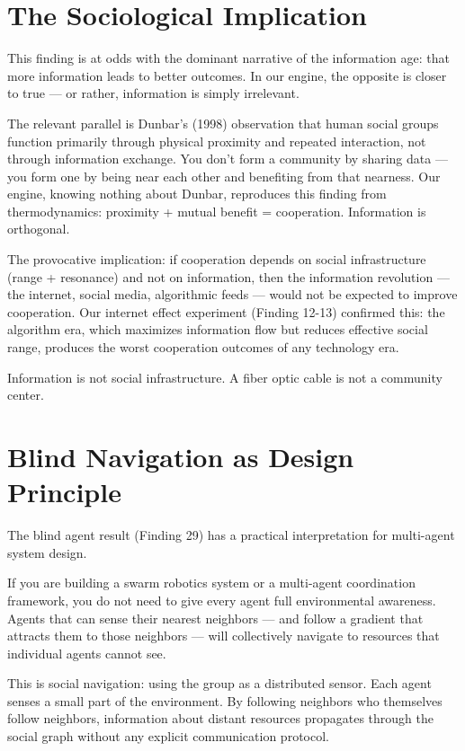 \section{The Sociological Implication}\label{the-sociological-implication}

This finding is at odds with the dominant narrative of the information age: that more information leads to better outcomes. In our engine, the opposite is closer to true --- or rather, information is simply irrelevant.

The relevant parallel is Dunbar's (1998) observation that human social groups function primarily through physical proximity and repeated interaction, not through information exchange. You don't form a community by sharing data --- you form one by being near each other and benefiting from that nearness. Our engine, knowing nothing about Dunbar, reproduces this finding from thermodynamics: proximity + mutual benefit = cooperation. Information is orthogonal.

The provocative implication: if cooperation depends on social infrastructure (range + resonance) and not on information, then the information revolution --- the internet, social media, algorithmic feeds --- would not be expected to improve cooperation. Our internet effect experiment (Finding 12-13) confirmed this: the algorithm era, which maximizes information flow but reduces effective social range, produces the worst cooperation outcomes of any technology era.

Information is not social infrastructure. A fiber optic cable is not a community center.

\section{Blind Navigation as Design Principle}\label{blind-navigation-as-design-principle}

The blind agent result (Finding 29) has a practical interpretation for multi-agent system design.

If you are building a swarm robotics system or a multi-agent coordination framework, you do not need to give every agent full environmental awareness. Agents that can sense their nearest neighbors --- and follow a gradient that attracts them to those neighbors --- will collectively navigate to resources that individual agents cannot see.

This is social navigation: using the group as a distributed sensor. Each agent senses a small part of the environment. By following neighbors who themselves follow neighbors, information about distant resources propagates through the social graph without any explicit communication protocol.

